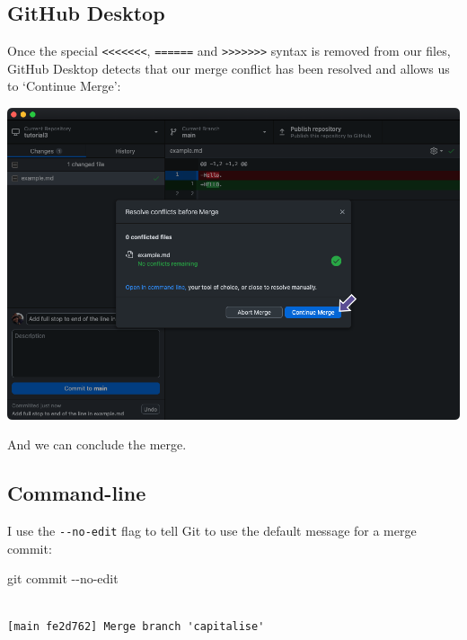 \documentclass[
  letterpaper,
  DIV=11,
  numbers=noendperiod]{scrartcl}
\newenvironment{Shaded}{\begin{snugshade}}{\end{snugshade}}
\newcommand{\NormalTok}[1]{\textcolor[rgb]{0.00,0.23,0.31}{#1}}
\newcommand{\SpecialCharTok}[1]{\textcolor[rgb]{0.37,0.37,0.37}{#1}}
\begin{document}
\subsection{GitHub Desktop}

Once the special
\texttt{\textless{}\textless{}\textless{}\textless{}\textless{}\textless{}\textless{}},
\texttt{======} and
\texttt{\textgreater{}\textgreater{}\textgreater{}\textgreater{}\textgreater{}\textgreater{}\textgreater{}}
syntax is removed from our files, GitHub Desktop detects that our merge
conflict has been resolved and allows us to `Continue Merge':

\includegraphics{images/image55.png}

And we can conclude the merge.

\subsection{Command-line}

I use the \texttt{-\/-no-edit} flag to tell Git to use the default
message for a merge commit:

\begin{Shaded}
\begin{Highlighting}[]
\NormalTok{git commit }\SpecialCharTok{{-}{-}}\NormalTok{no}\SpecialCharTok{{-}}\NormalTok{edit}
\end{Highlighting}
\end{Shaded}

\begin{verbatim}

[main fe2d762] Merge branch 'capitalise'
\end{verbatim}
\end{document}
